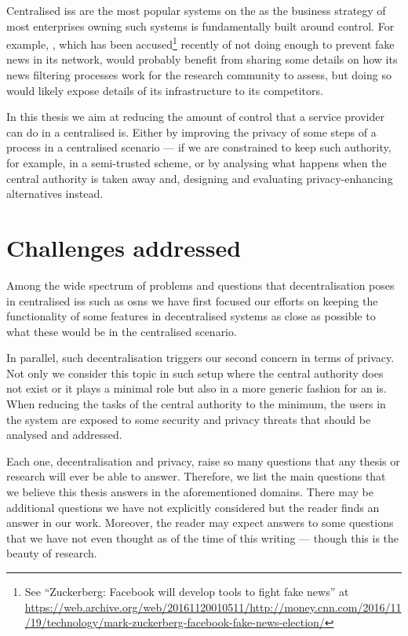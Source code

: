 \documentclass[showtrims, oldfontcommands]{kthesis}
\begin{document}
Centralised \acp{is} are the most popular systems on the \Internet as the business 
strategy of most enterprises owning such systems is fundamentally built around control. 
For example, \Facebook, which has been accused\footnote{See ``Zuckerberg: Facebook will develop tools to fight fake news'' at \url{https://web.archive.org/web/20161120010511/http://money.cnn.com/2016/11/19/technology/mark-zuckerberg-facebook-fake-news-election/}} 
recently of not doing enough to prevent fake news in its network, would probably 
benefit from sharing some details on how its news filtering processes work for the 
research community to assess, but doing so would likely expose details of its infrastructure 
to its competitors.

In this thesis we aim at reducing the amount of control that a service provider 
can do in a centralised \ac{is}. Either by improving the privacy of some steps of 
a process in a centralised scenario --- if we are constrained to keep such authority, 
for example, in a semi-trusted scheme, or by analysing what happens when the central 
authority is taken away and, designing and evaluating privacy-enhancing alternatives 
instead. 



\section{Challenges addressed}
    \label{section:challenges-addressed}
Among the wide spectrum of problems and questions that decentralisation poses in 
centralised \acp{is} such as \acp{osn} we have first focused our efforts on keeping 
the functionality of some features in decentralised systems as close as possible 
to what these would be in the centralised scenario.

In parallel, such decentralisation triggers our second concern in terms of privacy.
Not only we consider this topic in such setup where the central authority does not 
exist or it plays a minimal role but also in a more generic fashion for an \ac{is}. 
When reducing the tasks of the central authority to the minimum, the users in the 
system are exposed to some security and privacy threats that should be analysed 
and addressed.

Each one, decentralisation and privacy, raise so many questions that any thesis 
or research will ever be able to answer. Therefore, we list the main questions that 
we believe this thesis answers in the aforementioned domains. There may be additional 
questions we have not explicitly considered but the reader finds an answer in our 
work. Moreover, the reader may expect answers to some questions that we have not 
even thought as of the time of this writing --- though this is the beauty of research.
\end{document}
